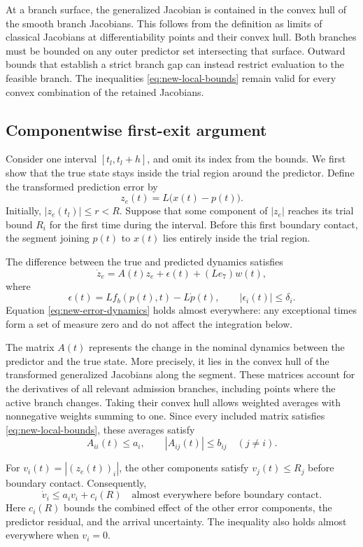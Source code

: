 \documentclass[preprint,12pt]{elsarticle}
\begin{document}
At a branch surface, the generalized Jacobian is contained in the convex hull
of the smooth branch Jacobians. This follows from the definition as limits
of classical Jacobians at differentiability points and their convex hull.
Both branches must be bounded on any outer predictor set intersecting that
surface. Outward bounds that establish a strict branch gap can instead
restrict evaluation to the feasible branch. The inequalities
\eqref{eq:new-local-bounds} remain valid for every convex combination of the
retained Jacobians.

\subsection{Componentwise first-exit argument}

Consider one interval $[t_l,t_l+h]$, and omit its index from the
bounds. We first show that the true state stays inside the trial
region around the predictor. Define the transformed prediction error
by
\[
 z_e(t)=L\bigl(x(t)-p(t)\bigr).
\]
Initially, $|z_e(t_l)|\le r<R$. Suppose that some component of
$|z_e|$ reaches its trial bound $R_i$ for the first time during
the interval. Before this first boundary contact, the segment
joining $p(t)$ to $x(t)$ lies entirely inside the trial region.

The difference between the true and predicted dynamics satisfies
\begin{equation}
 \dot z_e=A(t)z_e+\epsilon(t)+(Le_7)w(t),
 \label{eq:new-error-dynamics}
\end{equation}
where
\[
 \epsilon(t)=Lf_b(p(t),t)-L\dot p(t),
 \qquad |\epsilon_i(t)|\le\delta_i.
\]
Equation \eqref{eq:new-error-dynamics} holds almost everywhere:
any exceptional times form a set of measure zero and do not affect
the integration below.

The matrix $A(t)$ represents the change in the nominal dynamics
between the predictor and the true state. More precisely, it lies
in the convex hull of the transformed generalized Jacobians along
the segment. These matrices account for the derivatives of all
relevant admission branches, including points where the active
branch changes. Taking their convex hull allows weighted averages
with nonnegative weights summing to one. Since every included
matrix satisfies \eqref{eq:new-local-bounds}, these averages satisfy
\[
 A_{ii}(t)\le a_i,
 \qquad |A_{ij}(t)|\le b_{ij}\quad(j\ne i).
\]

For $v_i(t)=|(z_e(t))_i|$, the other components satisfy
$v_j(t)\le R_j$ before boundary contact. Consequently,
\begin{equation}
 \dot v_i\le a_i v_i+c_i(R)
 \quad\text{almost everywhere before boundary contact}.
 \label{eq:new-error-comparison-proof}
\end{equation}
Here $c_i(R)$ bounds the combined effect of the other error
components, the predictor residual, and the arrival uncertainty.
The inequality also holds almost everywhere when $v_i=0$.
\end{document}
